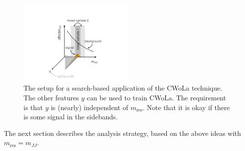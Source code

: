 \begin{figure}
\centering
\includegraphics[width=0.5\textwidth]{figures_CWoLa/cwolahuntingsetup.pdf}
\caption{The setup for a search-based application of the CWoLa technique.  The other features $y$ can be used to train CWoLa.  The requirement is that $y$ is (nearly) independent of $m_\text{res}$.  Note that it is okay if there is some signal in the sidebands.}
\label{fig:CWoLa:cwolahuntingsetup}
\end{figure}

The next section describes the analysis strategy, based on the above ideas with $m_\text{res}=m_{JJ}$.

